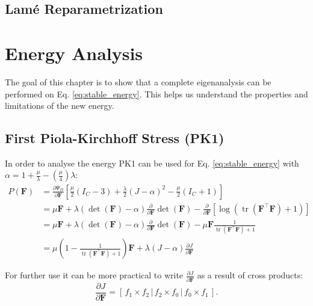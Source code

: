 
\subsection{Lamé Reparametrization}


\section{Energy Analysis}
The goal of this chapter is to show that a complete eigenanalysis can be performed on Eq. \ref{eq:stable_energy}. This helps us understand the properties and limitations of the new energy.


\subsection{First Piola-Kirchhoff Stress (PK1)}
In order to analyse the energy PK1 can be used for Eq. \ref{eq:stable_energy} with $\alpha=1+\frac{\mu}{\lambda}-\left(\frac{\mu}{4}\right)\lambda$:
\begin{align*}
P(\mathbf{F}) &= \frac{\partial \Psi_{D}}{\partial \mathbf{F}} \left[ \frac{\mu}{2}\left(I_{C}-3\right) + \frac{\lambda}{2}(J-\alpha)^{2} - \frac{\mu}{2}\left(I_{C}+1\right) \right] \\
&= \mu \mathbf{F} + \lambda (\operatorname{det}(\mathbf{F})-\alpha)  \frac{\partial}{\partial \mathbf{F}} \operatorname{det}(\mathbf{F}) - \frac{\partial}{\partial \mathbf{F}} \left[\operatorname{log}\left(\operatorname{tr}(\mathbf{F}^\intercal \mathbf{F})+1\right)\right] \\
&= \mu \mathbf{F} + \lambda (\operatorname{det}(\mathbf{F})-\alpha)  \frac{\partial}{\partial \mathbf{F}} \operatorname{det}(\mathbf{F}) - \mu \mathbf{F} \frac{1}{\operatorname{tr}(\mathbf{F}^\intercal \mathbf{F}) + 1} \\
&= \mu \left( 1 - \frac{1}{\operatorname{tr}(\mathbf{F}^\intercal \mathbf{F}) + 1}\right) \mathbf{F} + \lambda(J-\alpha)\frac{\partial J}{\partial \mathbf{F}}
\end{align*}

For further use it can be more practical to write $\frac{\partial J}{\partial \mathbf{F}}$ as a result of cross products:
\begin{equation}\label{eq:cross_product}
\frac{\partial J}{\partial \mathbf{F}} = \left[ \,f_1 \times f_2\, \bigg| \,f_2 \times f_0\, \bigg| \,f_0 \times f_1\, \right].
\end{equation}

